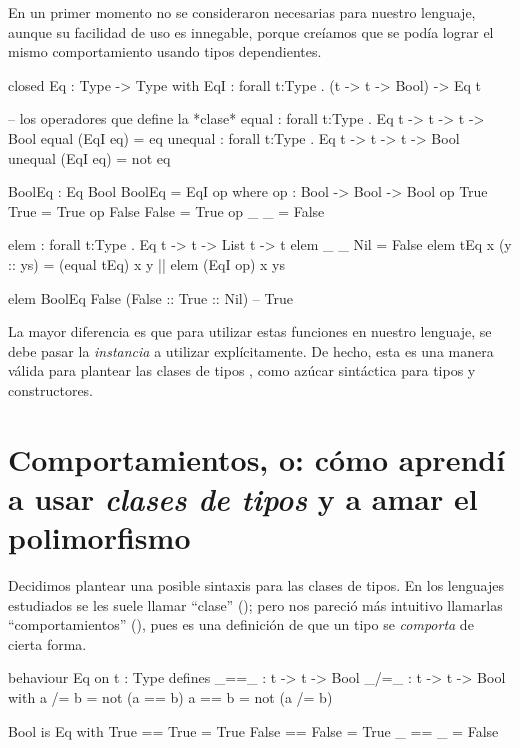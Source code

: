{\begin{designfr}
En un primer momento no se consideraron necesarias para nuestro lenguaje, aunque su facilidad de uso es innegable, porque creíamos que se podía lograr el mismo comportamiento usando tipos dependientes.

\begin{anglercode}
closed Eq : Type -> Type with
    EqI : forall t:Type . (t -> t -> Bool) -> Eq t

-- los operadores que define la *clase*
equal : forall t:Type . Eq t -> t -> t -> Bool
equal (EqI eq) = eq
unequal : forall t:Type . Eq t -> t -> t -> Bool
unequal (EqI eq) = not eq

BoolEq : Eq Bool
BoolEq = EqI op
    where
        op : Bool -> Bool -> Bool
        op True  True  = True
        op False False = True
        op _     _     = False

elem : forall t:Type . Eq t -> t -> List t -> t
elem _         _ Nil = False
elem tEq x (y :: ys) = (equal tEq) x y || elem (EqI op) x ys

elem BoolEq False (False :: True :: Nil)    -- True
\end{anglercode}

La mayor diferencia es que para utilizar estas funciones en nuestro lenguaje, se debe pasar la \emph{instancia} a utilizar explícitamente. De hecho, esta es una manera válida para plantear las clases de tipos \cite{scrap-type-classes}, como azúcar sintáctica para tipos y constructores.
\end{designfr}

\section{Comportamientos, o: cómo aprendí a usar \emph{clases de tipos} y a amar el polimorfismo}

\begin{designfr}
Decidimos plantear una posible sintaxis para las clases de tipos. En los lenguajes estudiados se les suele llamar \enquote{clase} (); pero nos pareció más intuitivo llamarlas \enquote{comportamientos} (), pues es una definición de que un tipo se \emph{comporta} de cierta forma.

\begin{anglercode}
behaviour Eq on t : Type defines
    _==_ : t -> t -> Bool
    _/=_ : t -> t -> Bool
  with
    a /= b = not (a == b)
    a == b = not (a /= b)

Bool is Eq with
    True  == True  = True
    False == False = True
    _     == _     = False


\end{anglercode}
\end{designfr}}
